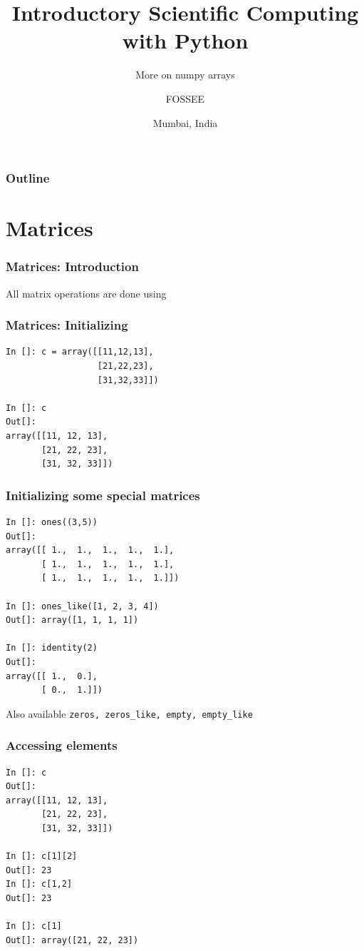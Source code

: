 \documentclass[14pt,compress]{beamer}
\title[More on numpy arrays]{Introductory Scientific Computing with
Python}
\subtitle{More on numpy arrays}
\author[FOSSEE] {FOSSEE}
\institute[FOSSEE -- IITB] {Department of Aerospace Engineering\\IIT Bombay}
\date[] {Mumbai, India}
\newcommand{\typ}[1]{\lstinline{#1}}
\newcommand{\kwrd}[1]{ \texttt{\textbf{\color{blue}{#1}}}  }
\begin{document}
\begin{frame}
  \titlepage
\end{frame}

\begin{frame}
  \frametitle{Outline}
  \tableofcontents
\end{frame}

\section{Matrices}

\begin{frame}
\frametitle{Matrices: Introduction}
\alert{All matrix operations are done using \kwrd{arrays}}
\end{frame}

\begin{frame}[fragile]
\frametitle{Matrices: Initializing}
\begin{lstlisting}
In []: c = array([[11,12,13],
                  [21,22,23],
                  [31,32,33]])

In []: c
Out[]:
array([[11, 12, 13],
       [21, 22, 23],
       [31, 32, 33]])
\end{lstlisting}
\end{frame}

\begin{frame}[fragile]
\frametitle{Initializing some special matrices}
\begin{small}
  \begin{lstlisting}
In []: ones((3,5))
Out[]:
array([[ 1.,  1.,  1.,  1.,  1.],
       [ 1.,  1.,  1.,  1.,  1.],
       [ 1.,  1.,  1.,  1.,  1.]])

In []: ones_like([1, 2, 3, 4])
Out[]: array([1, 1, 1, 1])

In []: identity(2)
Out[]:
array([[ 1.,  0.],
       [ 0.,  1.]])
  \end{lstlisting}
Also available \alert{\typ{zeros, zeros_like, empty, empty_like}}
\end{small}
\end{frame}


\begin{frame}[fragile]
  \frametitle{Accessing elements}
  \begin{small}
  \begin{lstlisting}
In []: c
Out[]:
array([[11, 12, 13],
       [21, 22, 23],
       [31, 32, 33]])

In []: c[1][2]
Out[]: 23
In []: c[1,2]
Out[]: 23

In []: c[1]
Out[]: array([21, 22, 23])
  \end{lstlisting}
  \end{small}
\end{frame}
\end{document}
